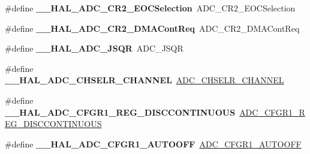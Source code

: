 \begin{DoxyCompactItemize}
\item 
\mbox{\label{group___h_a_l___a_d_c___aliased___macros_gafb4baec5d5d5ebf891a3cd8a9a0bfe65}} 
\#define {\bfseries \+\_\+\+\_\+\+H\+A\+L\+\_\+\+A\+D\+C\+\_\+\+C\+R2\+\_\+\+E\+O\+C\+Selection}~A\+D\+C\+\_\+\+C\+R2\+\_\+\+E\+O\+C\+Selection
\item 
\mbox{\label{group___h_a_l___a_d_c___aliased___macros_gaedcab24fbd762b1f6b65c7381f910308}} 
\#define {\bfseries \+\_\+\+\_\+\+H\+A\+L\+\_\+\+A\+D\+C\+\_\+\+C\+R2\+\_\+\+D\+M\+A\+Cont\+Req}~A\+D\+C\+\_\+\+C\+R2\+\_\+\+D\+M\+A\+Cont\+Req
\item 
\mbox{\label{group___h_a_l___a_d_c___aliased___macros_ga920c922d2385fcaab11b2ca7c8630da8}} 
\#define {\bfseries \+\_\+\+\_\+\+H\+A\+L\+\_\+\+A\+D\+C\+\_\+\+J\+S\+QR}~A\+D\+C\+\_\+\+J\+S\+QR
\item 
\mbox{\label{group___h_a_l___a_d_c___aliased___macros_gae5547f083abe059cacdcaac3e5066ea2}} 
\#define {\bfseries \+\_\+\+\_\+\+H\+A\+L\+\_\+\+A\+D\+C\+\_\+\+C\+H\+S\+E\+L\+R\+\_\+\+C\+H\+A\+N\+N\+EL}~\hyperlink{group___a_d_c___private___macros_ga5d9a732e25a3c6fda616bd7095d0bcb6}{A\+D\+C\+\_\+\+C\+H\+S\+E\+L\+R\+\_\+\+C\+H\+A\+N\+N\+EL}
\item 
\mbox{\label{group___h_a_l___a_d_c___aliased___macros_ga3703e313dbcb2af3dea5a07d622e67c6}} 
\#define {\bfseries \+\_\+\+\_\+\+H\+A\+L\+\_\+\+A\+D\+C\+\_\+\+C\+F\+G\+R1\+\_\+\+R\+E\+G\+\_\+\+D\+I\+S\+C\+C\+O\+N\+T\+I\+N\+U\+O\+US}~\hyperlink{group___a_d_c___private___macros_gaa0ec9cb0b5d97ba2d8bfd4fdf1f2a398}{A\+D\+C\+\_\+\+C\+F\+G\+R1\+\_\+\+R\+E\+G\+\_\+\+D\+I\+S\+C\+C\+O\+N\+T\+I\+N\+U\+O\+US}
\item 
\mbox{\label{group___h_a_l___a_d_c___aliased___macros_gab767937348c3e3b3c22e7316e42004c1}} 
\#define {\bfseries \+\_\+\+\_\+\+H\+A\+L\+\_\+\+A\+D\+C\+\_\+\+C\+F\+G\+R1\+\_\+\+A\+U\+T\+O\+O\+FF}~\hyperlink{group___a_d_c___private___macros_ga36993a7b32f5ec4f4163856f7ba8e8f0}{A\+D\+C\+\_\+\+C\+F\+G\+R1\+\_\+\+A\+U\+T\+O\+O\+FF}
\item 
\mbox{\label{group___h_a_l___a_d_c___aliased___macros_ga400e3c69f55dad73669df7ce10297066}} 

\end{DoxyCompactItemize}
